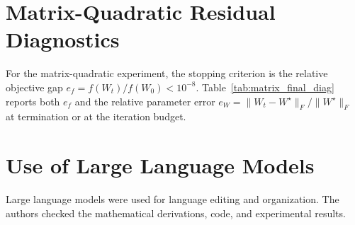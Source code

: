 \documentclass[sigconf,nonacm]{acmart}
\begin{document}
\begin{table}[t]
    \centering
    \caption{Optimizer and diagnostic hyperparameters. The grids are intentionally small diagnostic grids rather than exhaustive tuning ranges.}
    \label{tab:optimizer_hyperparams}
    
\end{table}

\section{Matrix-Quadratic Residual Diagnostics}
For the matrix-quadratic experiment, the stopping criterion is the relative objective gap $e_f=f(W_t)/f(W_0)<10^{-8}$. Table~\ref{tab:matrix_final_diag} reports both $e_f$ and the relative parameter error $e_W=\|W_t-W^\star\|_F/\|W^\star\|_F$ at termination or at the iteration budget.

\begin{table}[t]
    \centering
    \caption{Final residual diagnostics for the matrix-quadratic experiment. Runs with $>5000$ did not meet the relative objective-gap tolerance within the budget or diverged numerically.}
    \label{tab:matrix_final_diag}
    
\end{table}

\section{Use of Large Language Models}
Large language models were used for language editing and organization. The authors checked the mathematical derivations, code, and experimental results.
\end{document}
